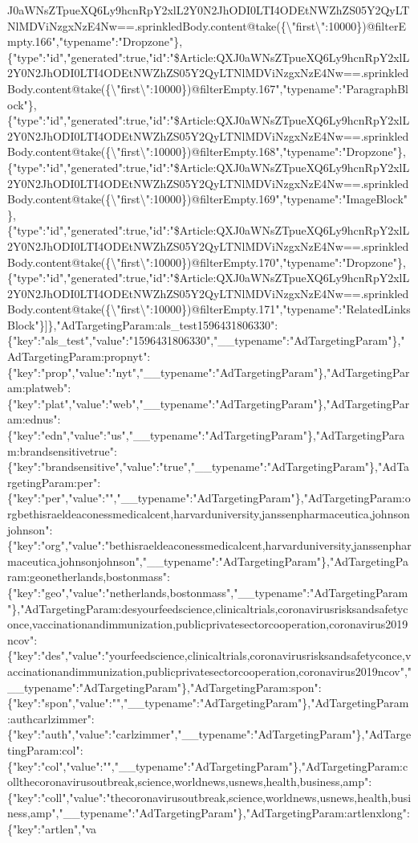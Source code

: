 J0aWNsZTpueXQ6Ly9hcnRpY2xlL2Y0N2JhODI0LTI4ODEtNWZhZS05Y2QyLTNlMDViNzgxNzE4Nw==.sprinkledBody.content@take(\{\textbackslash{}"first\textbackslash{}":10000\})@filterEmpty.166","typename":"Dropzone"\},\{"type":"id","generated":true,"id":"\$Article:QXJ0aWNsZTpueXQ6Ly9hcnRpY2xlL2Y0N2JhODI0LTI4ODEtNWZhZS05Y2QyLTNlMDViNzgxNzE4Nw==.sprinkledBody.content@take(\{\textbackslash{}"first\textbackslash{}":10000\})@filterEmpty.167","typename":"ParagraphBlock"\},\{"type":"id","generated":true,"id":"\$Article:QXJ0aWNsZTpueXQ6Ly9hcnRpY2xlL2Y0N2JhODI0LTI4ODEtNWZhZS05Y2QyLTNlMDViNzgxNzE4Nw==.sprinkledBody.content@take(\{\textbackslash{}"first\textbackslash{}":10000\})@filterEmpty.168","typename":"Dropzone"\},\{"type":"id","generated":true,"id":"\$Article:QXJ0aWNsZTpueXQ6Ly9hcnRpY2xlL2Y0N2JhODI0LTI4ODEtNWZhZS05Y2QyLTNlMDViNzgxNzE4Nw==.sprinkledBody.content@take(\{\textbackslash{}"first\textbackslash{}":10000\})@filterEmpty.169","typename":"ImageBlock"\},\{"type":"id","generated":true,"id":"\$Article:QXJ0aWNsZTpueXQ6Ly9hcnRpY2xlL2Y0N2JhODI0LTI4ODEtNWZhZS05Y2QyLTNlMDViNzgxNzE4Nw==.sprinkledBody.content@take(\{\textbackslash{}"first\textbackslash{}":10000\})@filterEmpty.170","typename":"Dropzone"\},\{"type":"id","generated":true,"id":"\$Article:QXJ0aWNsZTpueXQ6Ly9hcnRpY2xlL2Y0N2JhODI0LTI4ODEtNWZhZS05Y2QyLTNlMDViNzgxNzE4Nw==.sprinkledBody.content@take(\{\textbackslash{}"first\textbackslash{}":10000\})@filterEmpty.171","typename":"RelatedLinksBlock"\}{]}\},"AdTargetingParam:als\_test1596431806330":\{"key":"als\_test","value":"1596431806330","\_\_typename":"AdTargetingParam"\},"AdTargetingParam:propnyt":\{"key":"prop","value":"nyt","\_\_typename":"AdTargetingParam"\},"AdTargetingParam:platweb":\{"key":"plat","value":"web","\_\_typename":"AdTargetingParam"\},"AdTargetingParam:ednus":\{"key":"edn","value":"us","\_\_typename":"AdTargetingParam"\},"AdTargetingParam:brandsensitivetrue":\{"key":"brandsensitive","value":"true","\_\_typename":"AdTargetingParam"\},"AdTargetingParam:per":\{"key":"per","value":"","\_\_typename":"AdTargetingParam"\},"AdTargetingParam:orgbethisraeldeaconessmedicalcent,harvarduniversity,janssenpharmaceutica,johnsonjohnson":\{"key":"org","value":"bethisraeldeaconessmedicalcent,harvarduniversity,janssenpharmaceutica,johnsonjohnson","\_\_typename":"AdTargetingParam"\},"AdTargetingParam:geonetherlands,bostonmass":\{"key":"geo","value":"netherlands,bostonmass","\_\_typename":"AdTargetingParam"\},"AdTargetingParam:desyourfeedscience,clinicaltrials,coronavirusrisksandsafetyconce,vaccinationandimmunization,publicprivatesectorcooperation,coronavirus2019ncov":\{"key":"des","value":"yourfeedscience,clinicaltrials,coronavirusrisksandsafetyconce,vaccinationandimmunization,publicprivatesectorcooperation,coronavirus2019ncov","\_\_typename":"AdTargetingParam"\},"AdTargetingParam:spon":\{"key":"spon","value":"","\_\_typename":"AdTargetingParam"\},"AdTargetingParam:authcarlzimmer":\{"key":"auth","value":"carlzimmer","\_\_typename":"AdTargetingParam"\},"AdTargetingParam:col":\{"key":"col","value":"","\_\_typename":"AdTargetingParam"\},"AdTargetingParam:collthecoronavirusoutbreak,science,worldnews,usnews,health,business,amp":\{"key":"coll","value":"thecoronavirusoutbreak,science,worldnews,usnews,health,business,amp","\_\_typename":"AdTargetingParam"\},"AdTargetingParam:artlenxlong":\{"key":"artlen","va